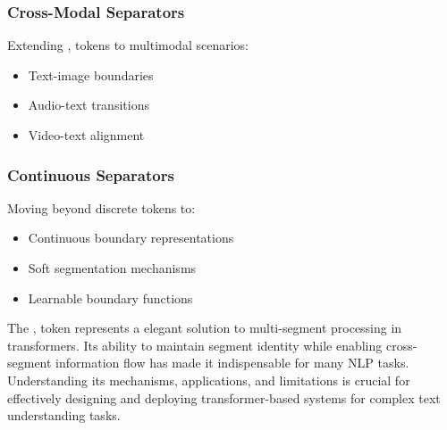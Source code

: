 \subsubsection{Cross-Modal Separators}
Extending \sep{} tokens to multimodal scenarios:
\begin{itemize}
\item Text-image boundaries
\item Audio-text transitions
\item Video-text alignment
\end{itemize}

\subsubsection{Continuous Separators}
Moving beyond discrete tokens to:
\begin{itemize}
\item Continuous boundary representations
\item Soft segmentation mechanisms
\item Learnable boundary functions
\end{itemize}

The \sep{} token represents a elegant solution to multi-segment processing in transformers. Its ability to maintain segment identity while enabling cross-segment information flow has made it indispensable for many NLP tasks. Understanding its mechanisms, applications, and limitations is crucial for effectively designing and deploying transformer-based systems for complex text understanding tasks.